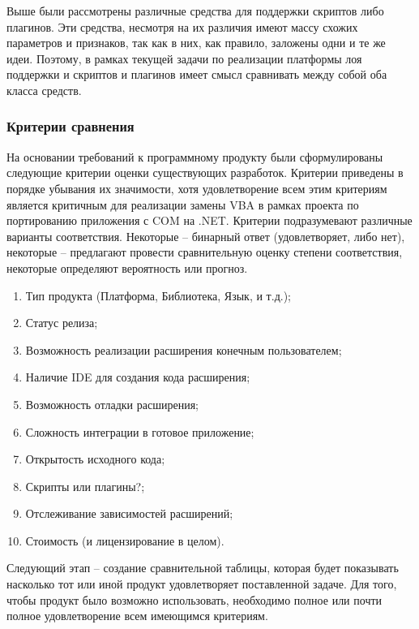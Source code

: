 Выше были рассмотрены различные средства для поддержки скриптов либо плагинов. Эти средства, несмотря на их различия имеют массу схожих параметров и признаков, так как в них, как правило, заложены одни и те же идеи. Поэтому, в рамках текущей задачи по реализации платформы лоя поддержки и скриптов и плагинов имеет смысл сравнивать между собой оба класса средств.

\subsubsection{Критерии сравнения}
На основании требований к программному продукту были сформулированы следующие критерии оценки существующих разработок. Критерии приведены в порядке убывания их значимости, хотя удовлетворение всем этим критериям является критичным для реализации замены VBA в рамках проекта по портированию приложения с COM на .NET. Критерии подразумевают различные варианты соответствия. Некоторые – бинарный ответ (удовлетворяет, либо нет), некоторые – предлагают провести сравнительную оценку степени соответствия, некоторые определяют вероятность или прогноз.

\begin{enumerate}
\item Тип продукта (Платформа, Библиотека, Язык, и т.д.);
\item Статус релиза;
\item Возможность реализации расширения конечным пользователем;
\item Наличие IDE для создания кода расширения;
\item Возможность отладки расширения;
\item Сложность интеграции в готовое приложение;
\item Открытость исходного кода;
\item Скрипты или плагины?;
\item Отслеживание зависимостей расширений;
\item Стоимость (и лицензирование в целом).
\end{enumerate}

Следующий этап – создание сравнительной таблицы, которая будет показывать насколько тот или иной продукт удовлетворяет поставленной задаче. Для того, чтобы продукт было возможно использовать, необходимо полное или почти полное удовлетворение всем имеющимся критериям.

\pagebreak
